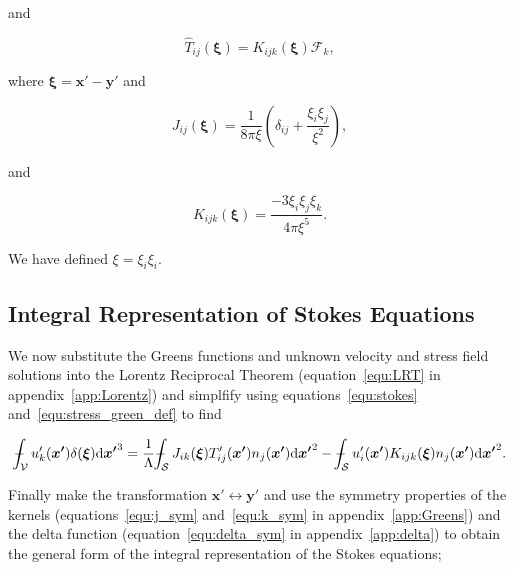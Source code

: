 \documentclass[12pt]{article}
\def\Xint#1{\mathchoice
{\XXint\displaystyle\textstyle{#1}}%
{\XXint\textstyle\scriptstyle{#1}}%
{\XXint\scriptstyle\scriptscriptstyle{#1}}%
{\XXint\scriptscriptstyle\scriptscriptstyle{#1}}%
\!\int}
\def\XXint#1#2#3{{\setbox0=\hbox{$#1{#2#3}{\int}$}
\vcenter{\hbox{$#2#3$}}\kern-.5\wd0}}
\def\dashint{\Xint-}
\begin{document}
and 

\begin{equation}
\label{equ:stress_green}
\hat{T}_{ij}(\boldsymbol{\xi}) = K_{ijk}(\boldsymbol{\xi}) \mathcal{F}_{k} ,
\end{equation}

where $\boldsymbol{\xi} = \boldsymbol{x'} - \boldsymbol{y'}$ and 

\begin{equation}
\label{equ:J_kernal}
J_{ij}(\boldsymbol{\xi}) = \frac{1}{8 \pi \xi} \left( \delta_{ij} + \frac{\xi_{i} \xi_{j}}{\xi^{2}} \right) ,
\end{equation}

and

\begin{equation}
\label{equ:K_kernal}
K_{ijk}(\boldsymbol{\xi}) = \frac{-3 \xi_{i} \xi_{j} \xi_{k}}{4 \pi \xi^{5}}.
\end{equation}

We have defined $\xi = \xi_{i} \xi_{i}$.

\subsection{Integral Representation of Stokes Equations}
\label{subsec:int_rep}

We now substitute the Greens functions and unknown velocity and stress field solutions into the Lorentz Reciprocal Theorem (equation~\ref{equ:LRT} in appendix~\ref{app:Lorentz}) and simplfify using equations~\ref{equ:stokes} and~\ref{equ:stress_green_def} to find

\begin{equation}
\label{equ:gen_int_rep}
\dashint_{\mathcal{V}} u'_{k}(\boldsymbol{x'}) \delta(\boldsymbol{\xi}) \mathrm{d} \boldsymbol{x'}^{3} = \frac{1}{\Lambda} \dashint_{\mathcal{S}} J_{ik}(\boldsymbol{\xi}) T'_{ij}(\boldsymbol{x'}) n_{j}(\boldsymbol{x'}) \mathrm{d} \boldsymbol{x'}^{2} - \dashint_{\mathcal{S}} u'_{i}(\boldsymbol{x'}) K_{ijk}(\boldsymbol{\xi}) n_{j}(\boldsymbol{x'}) \mathrm{d} \boldsymbol{x'}^{2} .
\end{equation}

Finally make the transformation $\boldsymbol{x'} \leftrightarrow \boldsymbol{y'}$ and use the symmetry properties of the kernels (equations~\ref{equ:j_sym} and~\ref{equ:k_sym} in appendix~\ref{app:Greens}) and the delta function (equation~\ref{equ:delta_sym} in appendix~\ref{app:delta}) to obtain the general form of the integral representation of the Stokes equations;
\end{document}
